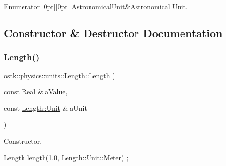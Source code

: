 \begin{DoxyEnumFields}{Enumerator}
[0pt][0pt]{}\mbox{\label{classostk_1_1physics_1_1units_1_1_length_a2664470a7eedf5d45c88861fe69badeaaa05a35804c7e4fff8e02f5a58782f133}} 
Astronomical\+Unit&Astronomical \hyperlink{classostk_1_1physics_1_1units_1_1_unit}{Unit}. \\
\hline

\end{DoxyEnumFields}


\subsection{Constructor \& Destructor Documentation}
\mbox{\label{classostk_1_1physics_1_1units_1_1_length_ae42146342ec60e8430fc111974c12366}} 
\subsubsection{\texorpdfstring{Length()}{Length()}}
{\footnotesize\ttfamily ostk\+::physics\+::units\+::\+Length\+::\+Length (\begin{DoxyParamCaption}\item[{const Real \&}]{a\+Value,  }\item[{const \hyperlink{classostk_1_1physics_1_1units_1_1_length_a2664470a7eedf5d45c88861fe69badea}{Length\+::\+Unit} \&}]{a\+Unit }\end{DoxyParamCaption})}



Constructor. 


\begin{DoxyCode}
\hyperlink{classostk_1_1physics_1_1units_1_1_length_ae42146342ec60e8430fc111974c12366}{Length} length(1.0, \hyperlink{classostk_1_1physics_1_1units_1_1_length_a2664470a7eedf5d45c88861fe69badeaa17c9c40b9db5a0983d1075a012c1f90a}{Length::Unit::Meter}) ;
\end{DoxyCode}



